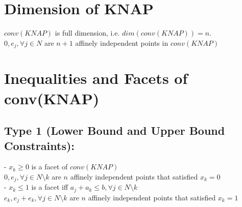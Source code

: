 		\section{Dimension of KNAP}
			$conv(KNAP)$ is full dimension, i.e. $dim(conv(KNAP))=n$.\\
			 $0, e_j, \forall j\in N$ are $n + 1$ affinely independent points in $conv(KNAP)$\\

		\section{Inequalities and Facets of conv(KNAP)}
			\subsection{Type 1 (Lower Bound and Upper Bound Constraints):}
				- $x_k\ge 0$ is a facet of $conv(KNAP)$\\
				 $0, e_j, \forall j\in N\setminus k$ are $n$ affinely independent points that satisfied $x_k=0$\\
				- $x_k\le 1$ is a facet iff $a_j + a_k \le b, \forall j\in N \setminus k$\\
				 $e_k, e_j+e_k, \forall j \in N\setminus k$ are $n$ affinely independent points that satisfied $x_k = 1$

